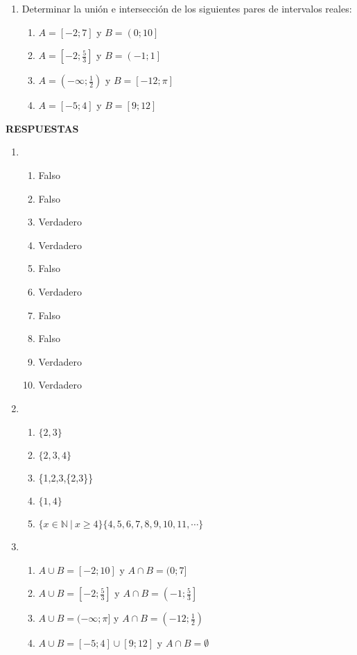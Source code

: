 \documentclass[a4paper]{article}
\newcommand{\exercise}{\item}
\newcommand{\intersec}{\cap}
\newcommand{\union}{\cup}
\newcommand{\df}[2]{\displaystyle\frac{#1}{#2}}
\begin{document}
\begin{enumerate}
	\exercise Determinar la unión e intersección de los siguientes pares de intervalos reales: 
	\begin{multicols}{3}
	\begin{enumerate} [label=(\alph*)]
		\item $A=\left[-2;7\right]$  y $B=\left(0;10\right]$
		\item $A=\left[-2;\df{5}{3}\right]$  y $B=\left(-1;1\right]$
		\item $A=\left(-\infty;\df{1}{2}\right)$  y $B=\left[-12;\pi \right]$
		\item $A=\left[-5;4\right]$  y $B=\left[9;12\right]$
	\end{enumerate}
	\end{multicols}
\end{enumerate}
\vspace{20pt} 
 \textbf{RESPUESTAS}\begin{enumerate}\exercise\begin{enumerate} [label=(\alph*)]		\item Falso
		\item Falso
		\item Verdadero
		\item Verdadero
		\item Falso
		\item Verdadero
		\item Falso
		\item Falso
		\item Verdadero
		\item Verdadero
\end{enumerate}\exercise\begin{enumerate} [label=(\alph*)]		\item $\{2,3\}$
		\item $\{2,3,4\}$
		\item \{1,2,3,\{2,3\}\}
		\item $\{1,4\}$
		\item $\{ x \in \mathbb{N} ~|~ x \geq 4 \}\{4,5,6,7,8,9,10,11, \cdots \}$
\end{enumerate}\exercise\begin{enumerate} [label=(\alph*)]		\item $A \union B = [-2;10]$ y $A \intersec B = (0;7]$
		\item $A \union B = \left[-2;\df{5}{3}\right]$ y $A \intersec B = \left(-1;\df{5}{3}\right]$
		\item $A \union B = (-\infty;\pi]$ y $A \intersec B = \left(-12;\df{1}{2}\right)$
		\item $A \union B = [-5;4] \union [9;12]$ y $A \intersec B = \emptyset$
\end{enumerate}\end{enumerate}
\end{document}
